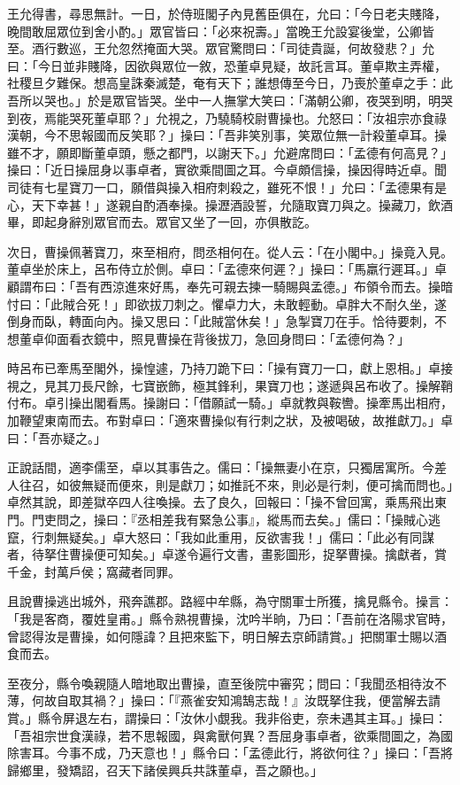 王允得書，尋思無計。一日，於侍班閣子內見舊臣俱在，允曰：「今日老夫賤降，晚間敢屈眾位到舍小酌。」眾官皆曰：「必來祝壽。」當晚王允設宴後堂，公卿皆至。酒行數巡，王允忽然掩面大哭。眾官驚問曰：「司徒貴誕，何故發悲？」允曰：「今日並非賤降，因欲與眾位一敘，恐董卓見疑，故託言耳。董卓欺主弄權，社稷旦夕難保。想高皇誅秦滅楚，奄有天下；誰想傳至今日，乃喪於董卓之手：此吾所以哭也。」於是眾官皆哭。坐中一人撫掌大笑曰：「滿朝公卿，夜哭到明，明哭到夜，焉能哭死董卓耶？」允視之，乃驍騎校尉曹操也。允怒曰：「汝祖宗亦食祿漢朝，今不思報國而反笑耶？」操曰：「吾非笑別事，笑眾位無一計殺董卓耳。操雖不才，願即斷董卓頭，懸之都門，以謝天下。」允避席問曰：「孟德有何高見？」操曰：「近日操屈身以事卓者，實欲乘間圖之耳。今卓頗信操，操因得時近卓。聞司徒有七星寶刀一口，願借與操入相府刺殺之，雖死不恨！」允曰：「孟德果有是心，天下幸甚！」遂親自酌酒奉操。操瀝酒設誓，允隨取寶刀與之。操藏刀，飲酒畢，即起身辭別眾官而去。眾官又坐了一回，亦俱散訖。

次日，曹操佩著寶刀，來至相府，問丞相何在。從人云：「在小閣中。」操竟入見。董卓坐於床上，呂布侍立於側。卓曰：「孟德來何遲？」操曰：「馬羸行遲耳。」卓顧謂布曰：「吾有西涼進來好馬，奉先可親去揀一騎賜與孟德。」布領令而去。操暗忖曰：「此賊合死！」即欲拔刀刺之。懼卓力大，未敢輕動。卓胖大不耐久坐，遂倒身而臥，轉面向內。操又思曰：「此賊當休矣！」急掣寶刀在手。恰待要刺，不想董卓仰面看衣鏡中，照見曹操在背後拔刀，急回身問曰：「孟德何為？」

時呂布已牽馬至閣外，操惶遽，乃持刀跪下曰：「操有寶刀一口，獻上恩相。」卓接視之，見其刀長尺餘，七寶嵌飾，極其鋒利，果寶刀也；遂遞與呂布收了。操解鞘付布。卓引操出閣看馬。操謝曰：「借願試一騎。」卓就教與鞍轡。操牽馬出相府，加鞭望東南而去。布對卓曰：「適來曹操似有行刺之狀，及被喝破，故推獻刀。」卓曰：「吾亦疑之。」

正說話間，適李儒至，卓以其事告之。儒曰：「操無妻小在京，只獨居寓所。今差人往召，如彼無疑而便來，則是獻刀；如推託不來，則必是行刺，便可擒而問也。」卓然其說，即差獄卒四人往喚操。去了良久，回報曰：「操不曾回寓，乘馬飛出東門。門吏問之，操曰：『丞相差我有緊急公事』，縱馬而去矣。」儒曰：「操賊心逃竄，行刺無疑矣。」卓大怒曰：「我如此重用，反欲害我！」儒曰：「此必有同謀者，待拏住曹操便可知矣。」卓遂令遍行文書，畫影圖形，捉拏曹操。擒獻者，賞千金，封萬戶侯；窩藏者同罪。

且說曹操逃出城外，飛奔譙郡。路經中牟縣，為守關軍士所獲，擒見縣令。操言：「我是客商，覆姓皇甫。」縣令熟視曹操，沈吟半晌，乃曰：「吾前在洛陽求官時，曾認得汝是曹操，如何隱諱？且把來監下，明日解去京師請賞。」把關軍士賜以酒食而去。

至夜分，縣令喚親隨人暗地取出曹操，直至後院中審究；問曰：「我聞丞相待汝不薄，何故自取其禍？」操曰：「『燕雀安知鴻鵠志哉！』汝既拏住我，便當解去請賞。」縣令屏退左右，謂操曰：「汝休小覷我。我非俗吏，奈未遇其主耳。」操曰：「吾祖宗世食漢祿，若不思報國，與禽獸何異？吾屈身事卓者，欲乘間圖之，為國除害耳。今事不成，乃天意也！」縣令曰：「孟德此行，將欲何往？」操曰：「吾將歸鄉里，發矯詔，召天下諸侯興兵共誅董卓，吾之願也。」

